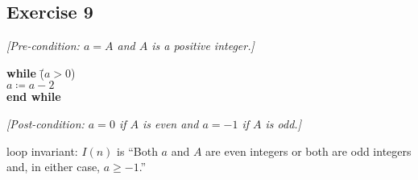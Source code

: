 \documentclass[14pt]{extarticle}
\begin{document}
\subsection{Exercise 9}
{\it [Pre-condition: $a = A$ and $A$ is a positive integer.]}

\begin{tabbing}
    {\bf while} \= ($a > 0$) \\
    \> $a \coloneqq a - 2$ \\
    {\bf end while}
\end{tabbing}

{\it [Post-condition: $a = 0$ if $A$ is even and $a = -1$ if $A$ is odd.]}

loop invariant: $I(n)$ is ``Both $a$ and $A$ are even integers or both are odd integers and, in either case, $a \geq -1$.''
\end{document}
